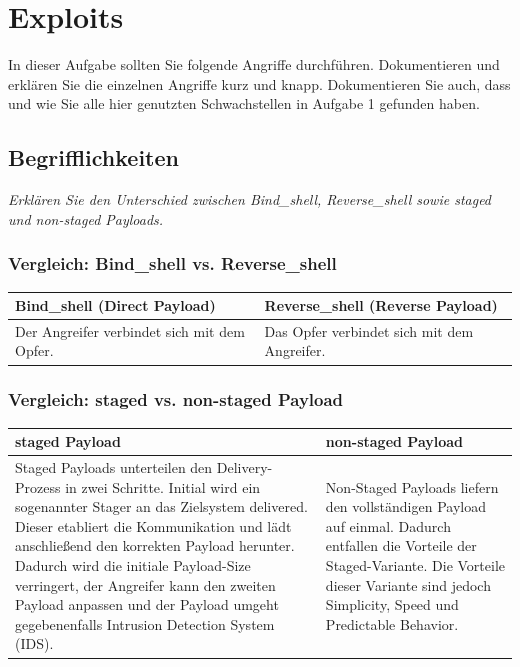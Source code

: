 \section{Exploits}
In dieser Aufgabe sollten Sie folgende Angriffe durchführen. Dokumentieren und erklären Sie die
einzelnen Angriffe kurz und knapp. Dokumentieren Sie auch, dass und wie Sie alle hier genutzten
Schwachstellen in Aufgabe 1 gefunden haben.

\subsection{Begrifflichkeiten}
\textit{Erklären Sie den Unterschied zwischen Bind\_shell, Reverse\_shell sowie staged und non-staged Payloads.}

\subsubsection{Vergleich: Bind\_shell vs. Reverse\_shell}
\begin{center}
    \begin{tabular}{|p{4cm}|p{4cm}|}
        \hline
        \textbf{Bind\_shell (Direct Payload)} & \textbf{Reverse\_shell (Reverse Payload)} \\ 
        \hline
        Der Angreifer verbindet sich mit dem Opfer. & Das Opfer verbindet sich mit dem Angreifer. \\ \hline
    \end{tabular}
\end{center}


\subsubsection{Vergleich: staged vs. non-staged Payload}
\begin{center}
    \begin{tabular}{|p{6cm}|p{6cm}|}
        \hline
        \textbf{staged Payload} & \textbf{non-staged Payload} \\
        \hline
        Staged Payloads unterteilen den Delivery-Prozess in zwei Schritte. Initial wird ein sogenannter Stager an das Zielsystem delivered. Dieser etabliert die Kommunikation und lädt anschließend den korrekten Payload herunter. Dadurch wird die initiale Payload-Size verringert, der Angreifer kann den zweiten Payload anpassen und der Payload umgeht gegebenenfalls Intrusion Detection System (IDS). & 
        Non-Staged Payloads liefern den vollständigen Payload auf einmal. Dadurch entfallen die Vorteile der Staged-Variante. Die Vorteile dieser Variante sind jedoch Simplicity, Speed und Predictable Behavior. \\
        \hline
    \end{tabular}
\end{center}


